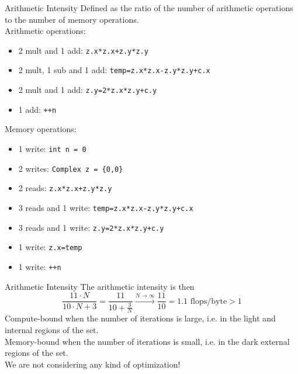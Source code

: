 %
%
\begin{frame}[fragile]{Arithmetic Intensity}
    Defined as the ratio of the number of arithmetic operations to
    the number of memory operations. \\
    Arithmetic operations:
    \begin{itemize}
        \item 2 mult and 1 add: \texttt{z.x*z.x+z.y*z.y}
        \item 2 mult, 1 sub and 1 add: \texttt{temp=z.x*z.x-z.y*z.y+c.x}
        \item 2 mult and 1 add: \texttt{z.y=2*z.x*z.y+c.y}
        \item 1 add: \texttt{++n}
    \end{itemize}
    Memory operations:
    \begin{itemize}
        \item 1 write: \texttt{int n = 0} 
        \item 2 writes: \texttt{Complex z = \{0,0\}}
        \item 2 reads: \texttt{z.x*z.x+z.y*z.y}
        \item 3 reads and 1 write: \texttt{temp=z.x*z.x-z.y*z.y+c.x}
        \item 3 reads and 1 write: \texttt{z.y=2*z.x*z.y+c.y}
        \item 1 write: \texttt{z.x=temp}
        \item 1 write: \texttt{++n}
    \end{itemize}
\end{frame}
\begin{frame}[fragile]{Arithmetic Intensity}
    The arithmetic intensity is then
    $$
        \frac{11 \cdot N}{ 10\cdot N + 3} 
        = \frac{11}{10+\frac{3}{N}} \xrightarrow{N \to \infty} \frac{11}{10}
        = 1.1 \text{ flops/byte} > 1
    $$
    Compute-bound when the number of iterations is large, i.e. in the light
    and internal regions of the set. \\
    Memory-bound when the number of iterations is small, i.e. in the
    dark external regions of the set. \\
    We are not considering any kind of optimization!
\end{frame}

